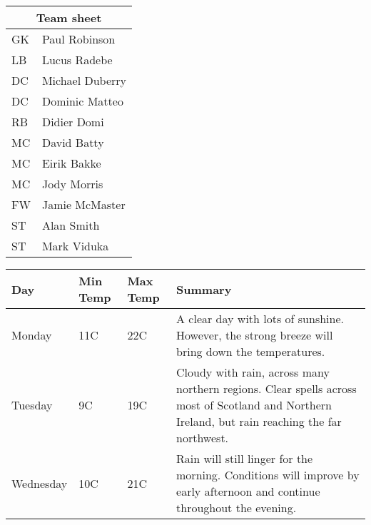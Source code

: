 \documentclass[12pt,a4paper,oneside,twocolumn]{article}
\begin{document}
	\begin{tabular}{|l|l|}
		\hline
		\multicolumn{2}{|c|}{Team sheet} \\
		\hline
		GK & Paul Robinson \\
		LB & Lucus Radebe \\
		DC & Michael Duberry \\
		DC & Dominic Matteo \\
		RB & Didier Domi \\
		MC & David Batty \\
		MC & Eirik Bakke \\
		MC & Jody Morris \\
		FW & Jamie McMaster \\
		ST & Alan Smith \\
		ST & Mark Viduka \\
		\hline
	\end{tabular}

	\clearpage

	\begin{table}
		\centering     %
		\begin{tabular}{ | l | l | l | p{5cm} |}
			\hline
			Day & Min Temp & Max Temp & Summary \\ \hline
			Monday & 11C & 22C & A clear day with lots of sunshine.  
			However, the strong breeze will bring down the temperatures. \\ \hline
			Tuesday & 9C & 19C & Cloudy with rain, across many northern regions. Clear spells 
			across most of Scotland and Northern Ireland, 
			but rain reaching the far northwest. \\ \hline
			Wednesday & 10C & 21C & Rain will still linger for the morning. 
			Conditions will improve by early afternoon and continue 
			throughout the evening. \\
			\hline
		\end{tabular}
	\end{table}
\end{document}
